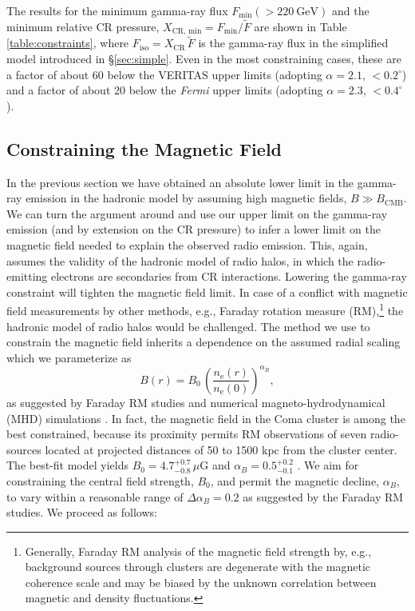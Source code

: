 \documentclass[12pt,manuscript]{aastex}
\newcommand{\rmn}{\mathrm}
\newcommand{\CR}{\mathrm{CR}}
\begin{document}
The results for the minimum gamma-ray flux $F_{\rmn{min}}(>220~\rmn{GeV})$ and the minimum relative
CR pressure, $X_{\CR,\,\rmn{min}} = F_{\rmn{min}}/\tilde{F}$ are shown in Table
\ref{table:constraints}, where $F_\rmn{iso} = X_\CR\,\tilde{F}$ is the gamma-ray flux in the simplified
model introduced in \S\ref{sec:simple}. Even in the most constraining cases,
these are a factor of about 60 below the VERITAS upper limits (adopting $\alpha=2.1$,
$<0.2^{\circ}$) and a factor of about 20 below the {\em Fermi} upper limits (adopting $\alpha=2.3$,
$<0.4^{\circ}$).

%
%
 
\subsection{Constraining the Magnetic Field}
\label{sec:B}
In the previous section we have obtained an absolute lower limit in the gamma-ray emission in
the hadronic model by assuming high magnetic fields, $B\gg B_\rmn{CMB}$. We can turn the
argument around and use our upper limit on the gamma-ray emission (and by extension on the
CR pressure) to infer a lower limit on the magnetic field needed to explain the observed radio
emission. This, again, assumes the validity of the hadronic model of radio halos, in which the
radio-emitting electrons are secondaries from CR interactions. Lowering the gamma-ray
constraint will tighten the magnetic field limit. In case of a conflict with magnetic field
measurements by other methods, e.g., Faraday rotation measure (RM),\footnote{Generally,
Faraday RM analysis of the magnetic field strength by, e.g., background sources through
clusters are degenerate with the magnetic coherence scale and may be biased by the unknown
correlation between magnetic and density fluctuations.} the hadronic model of radio halos would
be challenged. The method we use to constrain the magnetic field inherits a dependence on
the assumed radial scaling which we parameterize as
\begin{equation}
\label{eq:B}
B(r) = B_{0} \,\left(\frac{n_{\rmn{e}}(r)}{n_{\rmn{e}}(0)}\right)^{\alpha_B},
\end{equation}
as suggested by Faraday RM studies and numerical magneto-hydrodynamical (MHD) simulations
\citep[][and references therein]{article:Bonafede_etal:2010, article:Bonafede_etal:2011}. In fact,
the magnetic field in the Coma cluster is among the best constrained, because its proximity permits
RM observations of seven radio-sources located at projected distances of 50 to 1500 kpc from the
cluster center. The best-fit model yields $B_{0} = 4.7^{+0.7}_{-0.8}\,\mu$G and
$\alpha_{B} = 0.5^{+0.2}_{-0.1}$ \citep{article:Bonafede_etal:2010}. We aim for constraining the
central field strength, $B_{0}$, and permit the magnetic decline, $\alpha_{B}$, to vary
within a reasonable range of $\Delta\alpha_{B}=0.2$ as suggested by the Faraday RM studies.
We proceed as follows:
\end{document}
